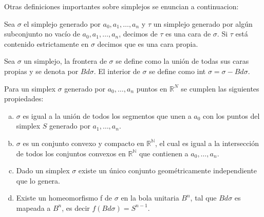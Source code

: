 %
Otras definiciones importantes sobre simplejos se enuncian a continuacion:
\begin{Defi}
Sea $\sigma$ el simplejo generado por $a_0,a_1,\ldots,a_n$ y $\tau$ un simplejo generado por algún subconjunto no vacío de $a_0,a_1,\ldots,a_n$, decimos de $\tau$ es una cara de $\sigma$. Si $\tau$ está contenido estrictamente en $\sigma$ decimos que es una cara propia. 
\end{Defi}
\begin{Defi}
Sea $\sigma$ un simplejo, la frontera de $\sigma$ se define como la unión de todas sus caras propias y se denota por $Bd\sigma$. El interior de $\sigma$ se define como int $\sigma = \sigma-Bd\sigma$. 
\end{Defi}
\begin{Prop}
Para un simplex $\sigma$ generado por $a_0,\ldots,a_n$ puntos en $\mathbb{R}^{N}$ se cumplen las siguientes propiedades:
\begin{enumerate}[(a)]
\item $\sigma$ es igual a la unión de todos los segmentos que unen a $a_0$ con los puntos del simplex $S$ generado por $a_1,\ldots,a_n$.
\item $\sigma$ es un conjunto convexo y compacto en $\mathbb{R^{N}}$, el cual es igual a la intersección de todos los conjuntos convexos en $\mathbb{R^{N}}$ que contienen a $a_0,\ldots,a_n$.
\item Dado un simplex $\sigma$ existe un único conjunto geométricamente independiente que lo genera.
\item Existe un homeomorfismo f de $\sigma$ en la bola unitaria $B^n$, tal que $Bd\sigma$ es mapeada a $B^n$, es decir $f(Bd\sigma) = S^{n-1}$.
\end{enumerate}
\end{Prop}

